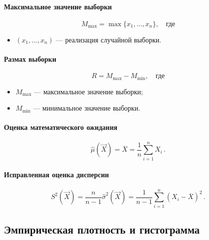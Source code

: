 \documentclass[a4paper, 12pt]{article}
\theoremstyle{definition}
\begin{document}
\paragraph{Максимальное значение выборки}

\begin{equation}
M_{\max} = \max \{ x_1, \dots, x_n\}, \quad \text{где}
\end{equation}
\begin{itemize}
	\item $(x_1, \dots, x_n)$ --- реализация случайной выборки.
\end{itemize}


\paragraph{Размах выборки}

\begin{equation}
R = M_{\max} - M_{\min}, \quad \text{где}
\end{equation}
\begin{itemize}
	\item $M_{\max}$ --- максимальное значение выборки;
	\item $M_{\min}$ --- минимальное значение выборки.
\end{itemize}


\paragraph{Оценка математического ожидания}

\begin{equation}
\hat{\mu}(\vec{X}) = \overline{X} = \frac{1}{n} \sum_{i = 1}^{n} X_i\,.
\end{equation}


\paragraph{Исправленная оценка дисперсии}

\begin{equation}
S^2(\vec{X}) = \frac{n}{n - 1}\hat{\sigma}^2(\vec{X}) = \frac{1}{n - 1}\sum_{i = 1}^{n} (X_i - \overline{X})^2\,.
\end{equation}



\subsection{Эмпирическая плотность и гистограмма}
\end{document}
